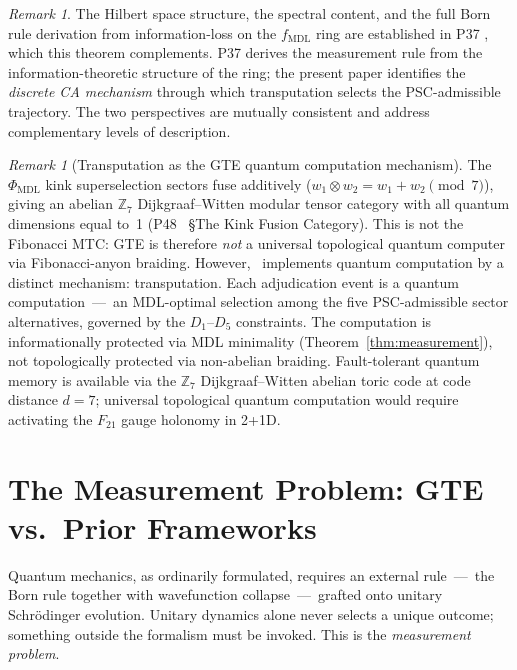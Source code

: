 \documentclass[11pt]{article}
\theoremstyle{remark}
\newtheorem{remark}[theorem]{Remark}
\newcommand{\GTE}{\text{GTE}}
\newcommand{\MDL}{\text{MDL}}
\newcommand{\ZS}{\ensuremath{\mathbb{Z}_7}}
\newcommand{\fmdl}{\ensuremath{f_{\mathrm{MDL}}}}
\begin{document}
\begin{remark}
The Hilbert space structure, the spectral content, and the full Born
rule derivation from information-loss on the \fmdl{} ring are established
in P37 \cite{SpivackQMFromR110}, which this theorem complements. P37
derives the measurement rule from the information-theoretic structure
of the ring; the present paper identifies the \emph{discrete CA mechanism}
through which transputation selects the PSC-admissible trajectory.
The two perspectives are mutually consistent and address complementary
levels of description.
\end{remark}

\begin{remark}[Transputation as the GTE quantum computation mechanism]
\label{rem:transputation_qc}
The $\Phi_{\MDL}$ kink superselection sectors fuse additively
($w_1 \otimes w_2 = w_1 + w_2 \pmod 7$), giving an abelian $\ZS$
Dijkgraaf--Witten modular tensor category with all quantum dimensions equal to~1
(P48~\cite{SpivackGTECompleteFramework} §The Kink Fusion Category).
This is not the Fibonacci MTC: GTE is therefore \emph{not} a universal topological
quantum computer via Fibonacci-anyon braiding.
However, \GTE\ implements quantum computation by a distinct mechanism: transputation.
Each adjudication event is a quantum computation~---~an MDL-optimal selection among
the five PSC-admissible sector alternatives, governed by the $D_1$--$D_5$ constraints.
The computation is informationally protected via MDL minimality (Theorem~\ref{thm:measurement}),
not topologically protected via non-abelian braiding.
Fault-tolerant quantum memory is available via the $\ZS$ Dijkgraaf--Witten abelian
toric code at code distance $d = 7$; universal topological quantum computation would
require activating the $F_{21}$ gauge holonomy in 2+1D.
\end{remark}


\section{The Measurement Problem: GTE vs.\ Prior Frameworks}
\label{sec:qm_comparison}

Quantum mechanics, as ordinarily formulated, requires an external rule~---~the
Born rule together with wavefunction collapse~---~grafted onto unitary
Schr\"odinger evolution.
Unitary dynamics alone never selects a unique outcome; something outside the
formalism must be invoked.
This is the \emph{measurement problem}.
\end{document}

